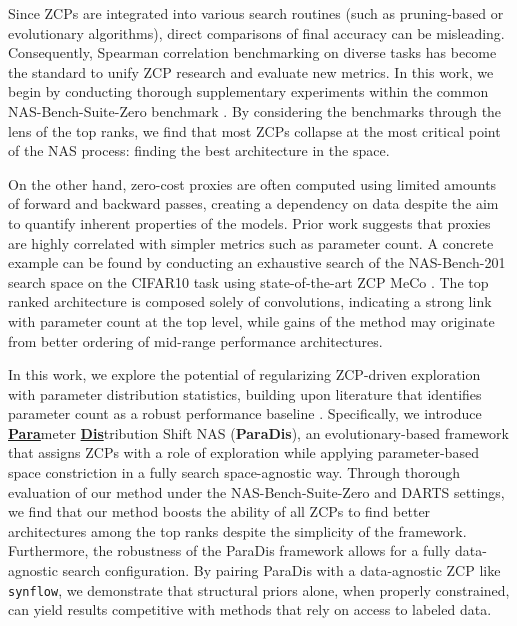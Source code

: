 \documentclass[10pt]{article} %
\begin{document}
Since ZCPs are integrated into various search routines (such as pruning-based or evolutionary algorithms), direct comparisons of final accuracy can be misleading. Consequently, Spearman correlation benchmarking on diverse tasks has become the standard to unify ZCP research and evaluate new metrics. In this work, we begin by conducting thorough supplementary experiments within the common NAS-Bench-Suite-Zero benchmark \citep{krishnakumar2022bench}. By considering the benchmarks through the lens of the top ranks, we find that most ZCPs collapse at the most critical point of the NAS process: finding the best architecture in the space.

On the other hand, zero-cost proxies are often computed using limited amounts of forward and backward passes, creating a dependency on data despite the aim to quantify inherent properties of the models. Prior work \citep{kadlecova2024surprisingly,krishnakumar2022bench} suggests that proxies are highly correlated with simpler metrics such as parameter count. A concrete example can be found by conducting an exhaustive search of the NAS-Bench-201 search space \citep{dong2020bench} on the CIFAR10 task \citep{krizhevsky2009learning} using state-of-the-art ZCP MeCo \citep{jiang2023meco}. The top ranked architecture is composed solely of convolutions, indicating a strong link with parameter count at the top level, while gains of the method may originate from better ordering of mid-range performance architectures.

In this work, we explore the potential of regularizing ZCP-driven exploration with parameter distribution statistics, building upon literature that identifies parameter count as a robust performance baseline \citep{colin2022adeeperlook,javaheripi2022litetransformersearch}. Specifically, we introduce \underline{\textbf{Para}}meter \underline{\textbf{Dis}}tribution Shift NAS (\textbf{ParaDis}), an evolutionary-based framework that assigns ZCPs with a role of exploration while applying parameter-based space constriction in a fully search space-agnostic way. Through thorough evaluation of our method under the NAS-Bench-Suite-Zero \citep{krishnakumar2022bench} and DARTS \citep{liu2018darts} settings, we find that our method boosts the ability of all ZCPs to find better architectures among the top ranks despite the simplicity of the framework. Furthermore, the robustness of the ParaDis framework allows for a fully data-agnostic search configuration. By pairing ParaDis with a data-agnostic ZCP like \texttt{synflow}, we demonstrate that structural priors alone, when properly constrained, can yield results competitive with methods that rely on access to labeled data.
\end{document}
